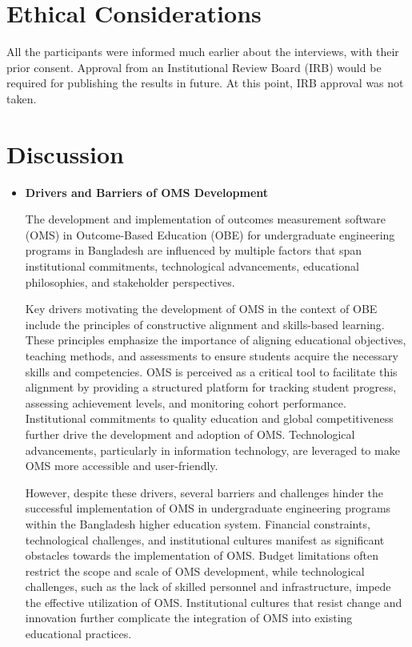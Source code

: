 \documentclass[journal,onecolumn]{IEEEtran}
\begin{document}
 
\section{\textbf{Ethical Considerations}}
 All the participants were informed much earlier about the interviews, with their prior consent. Approval from an Institutional Review Board (IRB) would be required for publishing the results in future. At this point, IRB approval was not taken. 

\section{\textbf{Discussion}}

\begin{itemize}
    \item \textbf{Drivers and Barriers of OMS Development}


The development and implementation of outcomes measurement software (OMS) in Outcome-Based Education (OBE) for undergraduate engineering programs in Bangladesh are influenced by multiple factors that span institutional commitments, technological advancements, educational philosophies, and stakeholder perspectives.

Key drivers motivating the development of OMS in the context of OBE include the principles of constructive alignment and skills-based learning. These principles emphasize the importance of aligning educational objectives, teaching methods, and assessments to ensure students acquire the necessary skills and competencies. OMS is perceived as a critical tool to facilitate this alignment by providing a structured platform for tracking student progress, assessing achievement levels, and monitoring cohort performance. Institutional commitments to quality education and global competitiveness further drive the development and adoption of OMS. Technological advancements, particularly in information technology, are leveraged to make OMS more accessible and user-friendly.

However, despite these drivers, several barriers and challenges hinder the successful implementation of OMS in undergraduate engineering programs within the Bangladesh higher education system. Financial constraints, technological challenges, and institutional cultures manifest as significant obstacles towards the implementation of OMS. Budget limitations often restrict the scope and scale of OMS development, while technological challenges, such as the lack of skilled personnel and infrastructure, impede the effective utilization of OMS. Institutional cultures that resist change and innovation further complicate the integration of OMS into existing educational practices.


\end{itemize}
\end{document}
